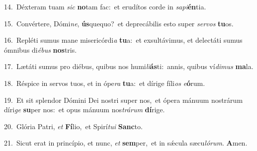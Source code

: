{\numbfont\textcolor{\numbcolor}{14.}}~Déxteram tuam \textit{sic} \textbf{no}\-tam fac:~\star et erudítos corde in \textit{sa}\-\textit{pi}\textbf{én}tia.\par
{\numbfont\textcolor{\numbcolor}{15.}}~Convértere, Dómi\-\textit{ne}\-, \textbf{ús}\-quequo?~\star et deprecábilis esto super \textit{ser}\-\textit{vos} \textbf{tu}\-os.\par
{\numbfont\textcolor{\numbcolor}{16.}}~Repléti sumus mane misericórdi\textit{a} \textbf{tu}\-a:~\star et exsultávimus, et delectáti sumus ómnibus di\-\textit{é}\-\textit{bus} \textbf{nos}\-tris.\par
{\numbfont\textcolor{\numbcolor}{17.}}~Lætáti sumus pro diébus, quibus nos humi\-\textit{li}\-\textbf{ás}ti:~\star annis, quibus ví\-\textit{di}\-\textit{mus} \textbf{ma}\-la.\par
{\numbfont\textcolor{\numbcolor}{18.}}~Réspice in servos tuos, et in ópe\textit{ra} \textbf{tu}\-a:~\star et dírige fíli\textit{os} \textit{e}\-\textbf{ó}rum.\par
{\numbfont\textcolor{\numbcolor}{19.}}~Et sit splendor Dómini Dei nostri super nos,~\dagger et ópera mánuum nostrárum díri\textit{ge} \textbf{su}\-per nos:~\star et opus mánuum nos\-\textit{trá}\-\textit{rum} \textbf{dí}\-rige.\par
{\numbfont\textcolor{\numbcolor}{20.}}~Glória Patri, \textit{et} \textbf{Fí}\-lio,~\star et Spirí\-\textit{tu}\-\textit{i} \textbf{Sanc}\-to.\par
{\numbfont\textcolor{\numbcolor}{21.}}~Sicut erat in princípio, et nunc, \textit{et} \textbf{sem}\-per,~\star et in sǽcula sæcu\-\textit{ló}\-\textit{rum}. \textbf{A}\-men.\par
